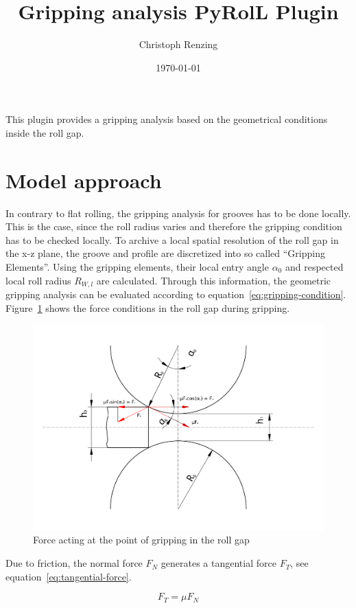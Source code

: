\documentclass[11pt]{PyRollDocs}
\begin{document}
    \title{Gripping analysis PyRolL Plugin}
    \author{Christoph Renzing}
    \date{\today}

    \maketitle

    This plugin provides a gripping analysis based on the geometrical conditions inside the roll gap.


    \section{Model approach}\label{sec:model-approach}

    In contrary to flat rolling, the gripping analysis for grooves has to be done locally.
    This is the case, since the roll radius varies and therefore the gripping condition has to be checked locally.
    To archive a local spatial resolution of the roll gap in the x-z plane, the groove and profile are discretized into so called \enquote{Gripping Elements}.
    Using the gripping elements, their local entry angle $\alpha_0$ and respected local roll radius $R_{W,l}$ are calculated.
    Through this information, the geometric gripping analysis can be evaluated according to equation~\ref{eq:gripping-condition}.
    Figure~\ref{fig:roll-gap-forces} shows the force conditions in the roll gap during gripping.

    \begin{figure}
        \centering
        \includegraphics[width=.5\textwidth]{img/gripping-forces}
        \caption{Force acting at the point of gripping in the roll gap}
        \label{fig:roll-gap-forces}
    \end{figure}

    \newpage

    Due to friction, the normal force $F_N$ generates a tangential force $F_T$, see equation~\ref{eq:tangential-force}.

    \begin{equation}
        F_T = \mu F_N
        \label{eq:tangential-force}
    \end{equation}
\end{document}
